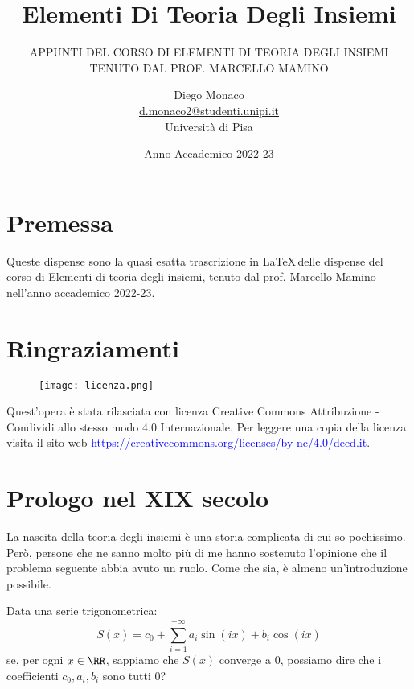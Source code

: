 \documentclass[11pt]{scrartcl}
\begin{document}
\title{Elementi Di Teoria Degli Insiemi}
\subtitle{\large\normalfont\rmfamily\scshape APPUNTI DEL CORSO DI ELEMENTI DI TEORIA DEGLI INSIEMI \\ TENUTO DAL PROF. MARCELLO MAMINO}
\author{Diego Monaco \\ \textnormal{\href{d.monaco2@studenti.unipi.it}{d.monaco2@studenti.unipi.it}} \\ Università di Pisa}
\date{Anno Accademico 2022-23}
\maketitle
\newpage

\tableofcontents
\eject
\newpage

\section*{Premessa}
Queste dispense sono la quasi esatta trascrizione in \LaTeX\,delle dispense del corso di Elementi di teoria degli insiemi, tenuto dal prof. Marcello Mamino nell'anno accademico 2022-23.
\section*{Ringraziamenti}

\mbox{}
\vfill
\begin{wrapfigure}{R}{0.2\textwidth}
	\centering
	\href{https://creativecommons.org/licenses/by-nc/4.0/deed.it}{\texttt{[image: licenza.png]}}
\end{wrapfigure}

Quest'opera è stata rilasciata con licenza Creative Commons Attribuzione - Condividi allo stesso modo 4.0 Internazionale. Per leggere
una copia della licenza visita il sito web \href{http://creativecommons.org/licenses/by-sa/4.0/deed.it}{\textcolor{blue}{https://creativecommons.org/licenses/by-nc/4.0/deed.it}}.\\

\newpage

\newpage
\section{Prologo nel XIX secolo}
La nascita della teoria degli insiemi è una storia complicata di cui so pochissimo. Però, persone che ne sanno molto più di me hanno sostenuto l'opinione che il problema seguente
abbia avuto un ruolo. Come che sia, è almeno un'introduzione possibile.

\begin{problem}
Data una serie trigonometrica:
\[ S(x) = c_0 + \sum_{i=1}^{+\infty}a_i\sin{(ix)}+b_i\cos{(ix)}
	\]
se, per ogni $x \in \RR$, sappiamo che $S(x)$ converge a 0, possiamo dire che i coefficienti $c_0,a_i,b_i$ sono tutti 0?
\end{problem}
\end{document}
